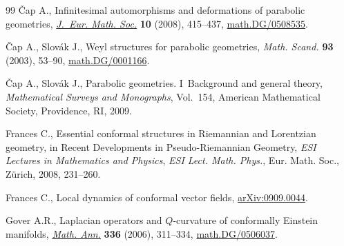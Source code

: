 \documentclass[11pt]{article}
\theoremstyle{plain}
\theoremstyle{definition}
\begin{document}
\begin{thebibliography}{99}
 \v{C}ap A.,
 Inf\/initesimal automorphisms and deformations of parabolic geometries,
\href{http://dx.doi.org/10.4171/JEMS/116}{{\it J.~Eur. Math. Soc.}} \textbf{10} (2008), 415--437,
\href{http://arxiv.org/abs/math.DG/0508535}{math.DG/0508535}.

\v{C}ap A., Slov\'ak J.,
Weyl structures for parabolic geometries,
{\it Math. Scand.} \textbf{93}  (2003), 53--90,
\href{http://arxiv.org/abs/math.DG/0001166}{math.DG/0001166}.

 \v{C}ap A., Slov\'ak J.,
 Parabolic geometries. I~Background and general theory,
{\it Mathematical Surveys and Monographs}, Vol.~154, American Mathematical Society, Providence, RI, 2009.

 Frances C.,
 Essential conformal structures in Riemannian and Lorentzian geometry,
 in Recent Developments in Pseudo-Riemannian Geometry, {\it ESI Lectures in Mathematics and Physics}, {\it ESI Lect. Math. Phys.},
 Eur. Math. Soc., Z\"urich, 2008, 231--260.

 Frances C.,
 Local dynamics of conformal vector f\/ields,
\href{http://arxiv.org/abs/0909.0044}{arXiv:0909.0044}.

Gover A.R.,
Laplacian operators and $Q$-curvature of conformally Einstein manifolds,
\href{http://dx.doi.org/10.1007/s00208-006-0004-z}{{\it Math. Ann.}} \textbf{336} (2006), 311--334,
\href{http://arxiv.org/abs/math.DG/0506037}{math.DG/0506037}.

\end{thebibliography}
\end{document}
